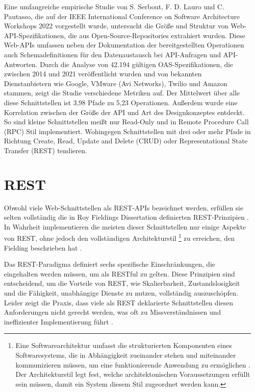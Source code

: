\documentclass[draft,final]{vutinfth} %
\begin{document}
Eine umfangreiche empirische Studie von S. Serbout,  F. D. Lauro und C. Pautasso, die auf der IEEE International Conference on Software Architecture Workshops 2022 vorgestellt wurde, untersucht die Größe und Struktur von Web-API-Spezifikationen, die aus Open-Source-Repositories extrahiert wurden. Diese Web-APIs umfassen neben der Dokumentation der bereitgestellten Operationen auch Schemadefinitionen für den Datenaustausch bei API-Anfragen und API-Antworten. 
Durch die Analyse von 42.194 gültigen OAS-Spezifikationen, die zwischen 2014 und 2021 veröffentlicht wurden und von bekannten Dienstanbietern wie Google, VMware (Avi Networks), Twilio und Amazon stammen, zeigt die Studie verschiedene Metriken auf. 
Der Mittelwert über alle diese Schnittstellen ist 3,98 Pfade zu 5,23 Operationen. 
Außerdem wurde eine Korrelation zwischen der Größe der API und Art des Designkonzeptes entdeckt. 
So sind kleine Schnittstellen meißt nur Read-Only und in Remote Procedure Call (RPC) Stil implementiert. 
Wohingegen Schnittstellen mit drei oder mehr Pfade in Richtung Create, Read, Update and Delete (CRUD) oder Representational State Transfer (REST) tendieren. \cite{Serbout:2022:WebApiStructures}


\section{REST}


Obwohl viele Web-Schnittstellen als REST-APIs bezeichnet werden, erfüllen sie selten vollständig die in Roy Fieldings Dissertation definierten REST-Prinzipien \cite{Neumann:2021:AnalysisOfRest}. 
In Wahrheit implementieren die meisten dieser Schnittstellen nur einige Aspekte von REST, ohne jedoch den vollständigen Architekturstil
\footnote{
	Eine Softwarearchitektur umfasst die strukturierten Komponenten eines Softwaresystems, die in Abhängigkeit zueinander stehen und miteinander kommunizieren müssen, um eine funktionierende Anwendung zu ermöglichen \cite{Fielding:2000:REST}. 
	Der Architekturstil legt fest, welche architektonischen Voraussetzungen erfüllt sein müssen, damit ein System diesem Stil zugeordnet werden kann.
}
zu erreichen, den Fielding beschrieben hat \cite{Neumann:2021:AnalysisOfRest}.

Das REST-Paradigma definiert sechs spezifische Einschränkungen, die eingehalten werden müssen, um als RESTful zu gelten. 
Diese Prinzipien sind entscheidend, um die Vorteile von REST, wie Skalierbarkeit, Zustandslosigkeit und die Fähigkeit, unabhängige Dienste zu nutzen, vollständig auszuschöpfen. 
Leider zeigt die Praxis, dass viele als REST deklarierte Schnittstellen diesen Anforderungen nicht gerecht werden, was oft zu Missverständnissen und ineffizienter Implementierung führt \cite{Neumann:2021:AnalysisOfRest}.
\end{document}
